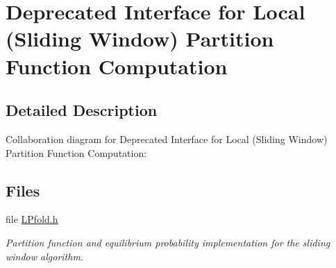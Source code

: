 \hypertarget{group__part__func__window__deprecated}{}\section{Deprecated Interface for Local (Sliding Window) Partition Function Computation}
\label{group__part__func__window__deprecated}


\subsection{Detailed Description}
Collaboration diagram for Deprecated Interface for Local (Sliding Window) Partition Function Computation\+:
\subsection*{Files}
\begin{DoxyCompactItemize}
\item 
file \mbox{\hyperlink{LPfold_8h}{L\+Pfold.\+h}}
\begin{DoxyCompactList}\small\item\em Partition function and equilibrium probability implementation for the sliding window algorithm. \end{DoxyCompactList}\end{DoxyCompactItemize}
